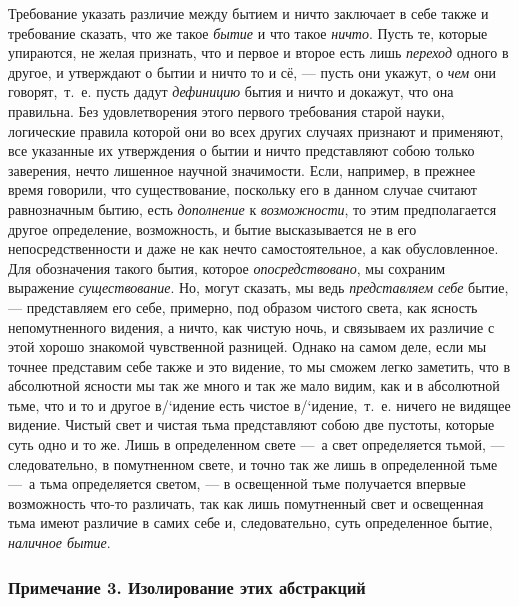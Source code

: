 Требование указать различие между бытием и ничто заключает в себе также и
требование сказать, что же такое {\em бытие} и что
такое {\em ничто}. Пусть те, которые упираются, не
желая признать, что и первое и второе есть лишь
{\em переход} одного в другое, и утверждают о бытии и
ничто то и сё, --- пусть они укажут, о {\em чем} они
говорят,~т.~е. пусть дадут {\em дефиницию} бытия и
ничто и докажут, что она правильна. Без удовлетворения этого первого
требования старой науки, логические правила которой они во всех других
случаях признают и применяют, все указанные их утверждения о бытии и ничто
представляют собою только заверения, нечто лишенное научной значимости.
Если, например, в прежнее время говорили, что существование, поскольку его
в данном случае считают равнозначным бытию, есть
{\em дополнение} к
{\em возможности}, то этим предполагается другое
определение, возможность, и бытие высказывается не в его непосредственности
и даже не как нечто самостоятельное, а как обусловленное. Для обозначения
такого бытия, которое {\em опосредствовано}, мы
сохраним выражение {\em существование}. Но, могут
сказать, мы ведь {\em представляем себе} бытие, ---
представляем его себе, примерно, под образом чистого света, как ясность
непомутненного видения, а ничто, как чистую ночь, и связываем их различие с
этой хорошо знакомой чувственной разницей. Однако на самом деле, если мы
точнее представим себе также и это видение, то мы сможем легко заметить,
что в абсолютной ясности мы так же много и так же мало видим, как и в
абсолютной тьме, что и то и другое в/`{и}дение есть чистое в/`{и}дение,~т.~е.
ничего не видящее видение. Чистый свет и чистая тьма представляют собою две
пустоты, которые суть одно и то же. Лишь в определенном свете ---~а свет
определяется тьмой, --- следовательно, в помутненном свете, и точно так же
лишь в определенной тьме ---~а тьма определяется светом, --- в освещенной тьме
получается впервые возможность что-то различать, так как лишь помутненный
свет и освещенная тьма имеют различие в самих себе и, следовательно, суть
определенное бытие, {\em наличное бытие}.


\subsubsection[Примечание 3. Изолирование этих абстракций]
{Примечание 3. Изолирование этих абстракций}

